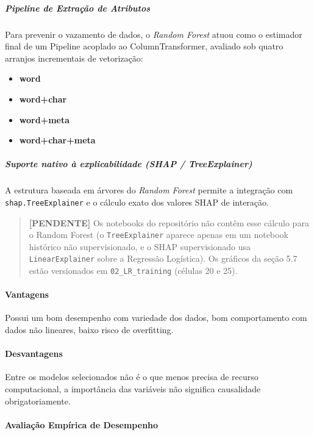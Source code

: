 \documentclass[
  brazilian,
  11pt,
]{article}
\providecommand{\tightlist}{%
  \setlength{\itemsep}{0pt}\setlength{\parskip}{0pt}}
\begin{document}
\subparagraph{Pipeline de Extração de Atributos}\label{pipeline-de-extrauxe7uxe3o-de-atributos-1}

Para prevenir o vazamento de dados, o \emph{Random Forest} atuou como o estimador final de um Pipeline acoplado ao ColumnTransformer, avaliado sob quatro arranjos incrementais de vetorização:

\begin{itemize}
\tightlist
\item
  \textbf{word}
\item
  \textbf{word+char}
\item
  \textbf{word+meta}
\item
  \textbf{word+char+meta}
\end{itemize}

\subparagraph{Suporte nativo à explicabilidade (SHAP / TreeExplainer)}\label{suporte-nativo-uxe0-explicabilidade-shap-treeexplainer}

A estrutura baseada em árvores do \emph{Random Forest} permite a integração com \texttt{shap.TreeExplainer} e o cálculo exato dos valores SHAP de interação.

\begin{quote}
\textbf{{[}PENDENTE{]}} Os notebooks do repositório não contêm esse cálculo para o Random Forest (o \texttt{TreeExplainer} aparece apenas em um notebook histórico não supervisionado, e o SHAP supervisionado usa \texttt{LinearExplainer} sobre a Regressão Logística). Os gráficos da seção 5.7 estão versionados em \texttt{02\_LR\_training} (células 20 e 25).
\end{quote}

\paragraph{Vantagens}\label{vantagens-1}

Possui um bom desempenho com variedade dos dados, bom comportamento com dados não lineares, baixo risco de overfitting.

\paragraph{Desvantagens}\label{desvantagens-1}

Entre os modelos selecionados não é o que menos precisa de recurso computacional, a importância das variáveis não significa causalidade obrigatoriamente.

\paragraph{Avaliação Empírica de Desempenho}\label{avaliauxe7uxe3o-empuxedrica-de-desempenho-1}
\end{document}
